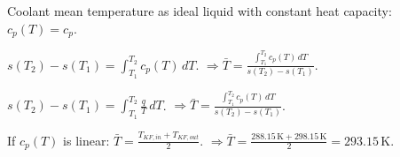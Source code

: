 Coolant mean temperature as ideal liquid with constant heat capacity: \( c_p(T) = c_p \).  

\( s(T_2) - s(T_1) = \int_{T_1}^{T_2} c_p(T) \, dT \).  
\( \Rightarrow \bar{T} = \frac{\int_{T_1}^{T_2} c_p(T) \, dT}{s(T_2) - s(T_1)} \).  

\( s(T_2) - s(T_1) = \int_{T_1}^{T_2} \frac{q}{T} \, dT \).  
\( \Rightarrow \bar{T} = \frac{\int_{T_1}^{T_2} c_p(T) \, dT}{s(T_2) - s(T_1)} \).  

If \( c_p(T) \) is linear:  
\( \bar{T} = \frac{T_{KF,in} + T_{KF,out}}{2} \).  
\( \Rightarrow \bar{T} = \frac{288.15 \, \text{K} + 298.15 \, \text{K}}{2} = 293.15 \, \text{K} \).